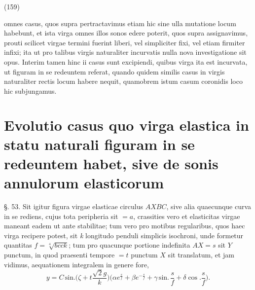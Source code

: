 \documentclass[11pt,a4paper]{article}
\begin{document}
(159)

omnes casus, quos supra pertractavimus etiam hic sine ulla mutatione locum
habebunt, et ista virga omnes illos sonos edere poterit, quos supra assignavimus,
prouti scilicet virgae termini fuerint liberi, vel simpliciter fixi, vel etiam
firmiter infixi; ita ut pro talibus virgis naturaliter incurvatis nulla
nova investigatione sit opus. Interim tamen hinc ii casus sunt
excipiendi, quibus virga ita est incurvata, ut figuram in se redeuntem
referat, quando quidem similis casus in virgis naturaliter rectis
locum habere nequit, quamobrem istum casum coronidis loco
hic subjungamus.

\section{Evolutio casus quo virga elastica in statu naturali figuram in se redeuntem habet, sive de sonis annulorum elasticorum}

§. 53. Sit igitur figura virgae elasticae circulus $AXBC$, sive alia
quaecunque curva in se rediens, cujus tota peripheria sit $=a$,
crassities vero et elasticitas virgae maneant eadem ut ante stabilitae;
tum vero pro motibus regularibus, quos haec virga recipere potest,
sit \emph{k} longitudo penduli simplicis isochroni, unde formetur quantitas
$f=\sqrt[4]{bcck}$; tum pro quacunque portione indefinita $AX=s$ sit $Y$ punctum,
in quod praesenti tempore $=t$ punctum $X$ sit translatum, et jam
vidimus, aequationem integralem in genere fore,
\[ y=C\,\text{sin.}\Big(\zeta+t\frac{\surd 2g}{k}\Big)\Big(\alpha e^{\frac{s}{f}}+\beta e^{-\frac{s}{f}}+\gamma\,\text{sin.}\,\frac{s}{f}+\delta\cos.\frac{s}{f}\Big). \]
\end{document}
